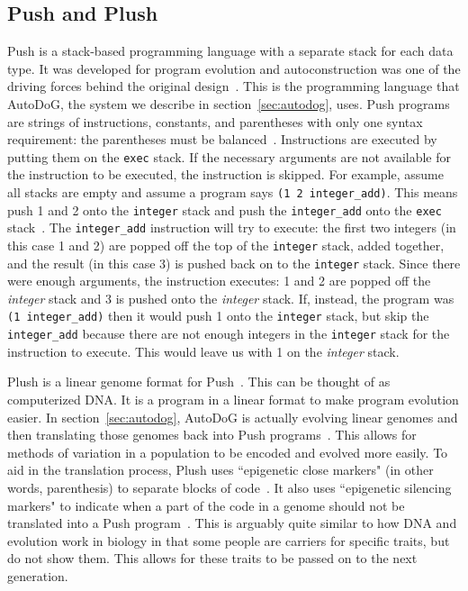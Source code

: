 \documentclass{sig-alternate}
\begin{document}
\subsection{Push and Plush}
\label{sec:push}
Push is a stack-based programming language with a separate stack for each data type. It was developed for program evolution and autoconstruction was one of the driving forces behind the original design~\cite{spector:2016}. This is the programming language that AutoDoG, the system we describe in section~\ref{sec:autodog}, uses. Push programs are strings of instructions, constants, and parentheses with only one syntax requirement: the parentheses must be balanced~\cite{lee:2001}. Instructions are executed by putting them on the \texttt{exec} stack. If the necessary arguments are not available for the instruction to be executed, the instruction is skipped. For example, assume all stacks are empty and assume a program says \texttt{(1 2 integer\_add)}. This means push 1 and 2 onto the \texttt{integer} stack and push the \texttt{integer\_add} onto the \texttt{exec} stack~\cite{lee:tutorial}. The \texttt{integer\_add} instruction will try to execute: the first two integers (in this case 1 and 2)  are popped off the top of the \texttt{integer} stack, added together, and the result (in this case 3) is pushed back on to the \texttt{integer} stack. Since there were enough arguments, the instruction executes: 1 and 2 are popped off the \textit{integer} stack and 3 is pushed onto the \textit{integer} stack. If, instead, the program was \texttt{(1 integer\_add)} then it would push 1 onto the \texttt{integer} stack, but skip the \texttt{integer\_add} because there are not enough integers in the \texttt{integer} stack for the instruction to execute. This would leave us with 1 on the \textit{integer} stack.

Plush is a linear genome format for Push~\cite{spector:2016}. This can be thought of as computerized DNA. It is a program in a linear format to make program evolution easier.
In section~\ref{sec:autodog}, AutoDoG is actually evolving linear genomes and then translating those genomes back into Push programs~\cite{spector:2016}. This allows for methods of variation in a population to be encoded and evolved more easily. To aid in the translation process, Plush uses ``epigenetic close markers" (in other words, parenthesis) to separate blocks of code~\cite{spector:2016}. It also uses ``epigenetic silencing markers" to indicate when a part of the code in a genome should not be translated into a Push program~\cite{spector:2016}. This is arguably quite similar to how DNA and evolution work in biology in that some people are carriers for specific traits, but do not show them. This allows for these traits to be passed on to the next generation.
\end{document}
